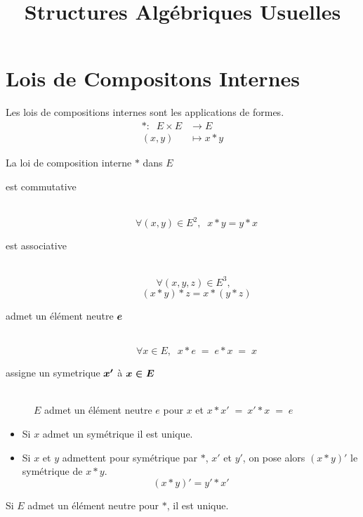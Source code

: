 

\title{Structures Algébriques Usuelles}



\section{Lois de Compositons Internes}

\begin{dfn}
Les lois de compositions internes sont les applications de formes.
\begin{align*}
    * : \;\;    E \times E &\to E \\
                (x, y) &\mapsto x * y
\end{align*}
\end{dfn}

\begin{dfn}
La loi de composition interne $*$ dans $E$
\begin{description}
    \item[est commutative] \quad \\
    \[\forall (x, y) \in E^2, \;\; x * y = y * x\]
    \item[est associative] \quad \\
    \[\forall (x, y, z) \in E^3, \;\;\]
    \[(x * y) * z = x * (y * z)\]
    \item[admet un élément neutre $\boldsymbol{e}$] \quad \\
    \[\forall x \in E,\;\; x * e \;=\; e * x \;=\; x\]
    \item[assigne un symetrique $\boldsymbol{x'}$ à $\boldsymbol{x \in E}$] \quad \\
    $E$ admet un élément neutre $e$ pour $x$
    et $x * x' \;=\: x' * x \;=\; e$
\end{description}
\end{dfn}

\begin{prp}
\begin{itemize}
    \item Si $x$ admet un symétrique il est unique.
    \item Si $x$ et $y$ admettent pour symétrique par $*$,
    $x'$ et $y'$, on pose alors $(x * y)'$ le symétrique de $x * y$.
    \[
        (x * y)' = y' * x'
    \]
\end{itemize}
\end{prp}

\begin{prp}
Si $E$ admet un élément neutre pour $*$, il est unique.
\end{prp}

